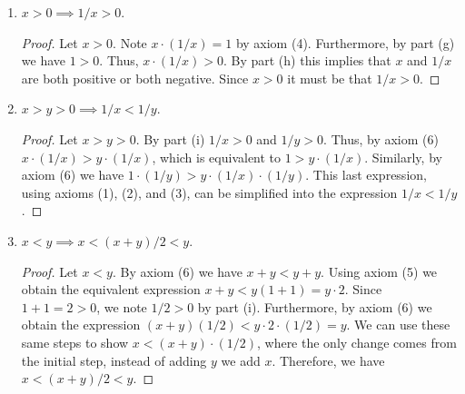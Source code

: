 \documentclass[12pt]{article}
\begin{document}
\begin{enumerate}[label=(\alph*)]
\begin{proof}
			Let $xy > 0$. Assume for contradiction $x > 0$ and $y < 0$. Then, by part 
			(c) it must be that $-y > 0$. By axiom (6), $x(-y) > 0$. By part (e) in 
			\textbf{Exercise 1} we obtain the equivalent expression $-(xy) > 0$. By 
			part (c) we have that $xy < 0$. This is a contradiction since $xy > 0$. Therefore,
			it cannot be that $x > 0$ and $y < 0$. We can use this argument of contradiction with
			the case $x < 0$ and $y > 0$ to show that this is also not possible. If either
			$x$ or $y$ is zero, then their product is zero, which also contradicts the fact
			$xy > 0$. Thus, the only cases that remain is that $x$ and $y$ are both positive
			or both negative, which as proven earlier does not cause a contradiction. Therefore,
			if $xy > 0$, then it must be that $x$ and $y$ are both positive or both negative.
		\end{proof}
		\item $x > 0 \implies 1/x >0$.
		\begin{proof}
			Let $x > 0$. Note $x \cdot (1/x) = 1$ by axiom (4). Furthermore, by part (g) we have
			$1 > 0$. Thus, $x \cdot (1/x) > 0$. By part (h) this implies that $x$ and 
			$1/x$ are both positive or both negative. Since $x > 0$ it must be that 
			$1/x > 0$.
		\end{proof}
		\item $x > y > 0 \implies 1/x < 1/y$.
		\begin{proof}
			Let $x > y > 0$. By part (i) $1/x > 0$ and $1/y > 0$. Thus, by axiom (6)
			$x \cdot (1/x) > y \cdot (1/x)$, which is equivalent to $1 > y \cdot (1/x)$.
			Similarly, by axiom (6) we have $1 \cdot (1/y) > y \cdot (1/x) \cdot (1/y)$.
			This last expression, using axioms (1), (2), and (3), can be simplified 
			into the expression $1/x < 1/y$.
		\end{proof}
		\item $x < y \implies x < (x + y)/2 < y$. 
		\begin{proof}
			Let $x < y$. By axiom (6) we have $x + y < y + y$. Using axiom (5) we obtain
			the equivalent expression $x + y < y(1 + 1) = y \cdot 2$. Since $1 + 1 = 2 > 0$,
			we note $1/2 > 0$ by part (i). Furthermore, by axiom (6)
			we obtain the expression $(x + y)(1/2) < y \cdot 2 \cdot (1/2) = y$.
			We can use these same steps to show $x < (x + y) \cdot (1/2)$, where the only
			change comes from the initial step, instead of adding $y$ we add $x$.
			Therefore, we have $x < (x + y)/2 < y$.
		\end{proof}
	\end{enumerate}
	
\end{document}
